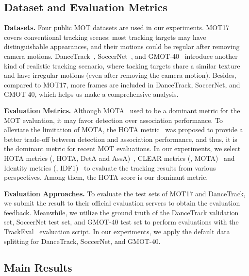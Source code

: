 \documentclass[journal]{IEEEtran}
\begin{document}
\subsection{Dataset and Evaluation Metrics}
\label{sec:setting}
\noindent \textbf{Datasets.}
Four public MOT datasets are used in our experiments. MOT17~\cite{MOT16} covers conventional tracking scenes: most tracking targets may have distinguishable appearances, and their motions could be regular after removing camera motions. DanceTrack~\cite{sun2022dancetrack}, SoccerNet~\cite{cioppa2022soccernet,deliege2021soccernet}, and GMOT-40~\cite{bai2021gmot} introduce another kind of realistic tracking scenario, where tacking targets share a similar texture and have irregular motions (even after removing the camera motion). Besides, compared to MOT17, more frames are included in DanceTrack, SoccerNet, and GMOT-40, which helps us make a comprehensive analysis.


\noindent \textbf{Evaluation Metrics.}
Although MOTA~\cite{bernardin2008evaluating} used to be a dominant metric for the MOT evaluation, it may favor detection over association performance. To alleviate the limitation of MOTA, the HOTA metric~\cite{luiten2020IJCV} was proposed to provide a better trade-off between detection and association performance, and thus, it is the dominant metric for recent MOT evaluations. In our experiments, we select HOTA metrics (\ie, HOTA, DetA and AssA)~\cite{luiten2020IJCV}, CLEAR metrics (\ie, MOTA)~\cite{bernardin2008evaluating} and Identity metrics (\ie, IDF1)~\cite{ristani2016performance} to evaluate the tracking results from various perspectives. Among them, the HOTA score is our dominant metric.

\noindent \textbf{Evaluation Approaches.} To evaluate the test sets of MOT17 and DanceTrack, we submit the result to their official evaluation servers
to obtain the evaluation feedback. Meanwhile, we utilize the ground truth of the DanceTrack validation set, SoccerNet test set, and GMOT-40 test set to perform evaluations with the TrackEval~\cite{luiten2020IJCV} evaluation script. In our experiments, we apply the default data splitting for DanceTrack, SoccerNet, and GMOT-40. 




\subsection{Main Results}
\label{sec:main_results}
\end{document}
